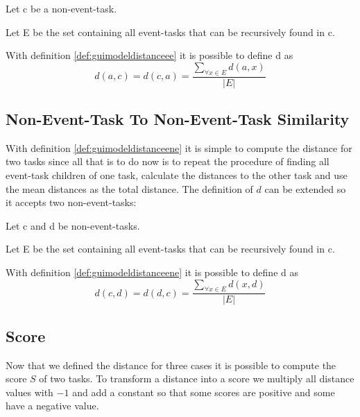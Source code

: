 \begin{definition}
	\item Let c be a non-event-task.
	\item Let E be the set containing all event-tasks that can be recursively found in c.
	\item With definition \ref{def:guimodeldistanceee} it is possible to define d as
\begin{equation*}
	d(a,c) = d(c,a) = \frac{\sum_{\forall x \in E} d(a,x)}{|E|}
\end{equation*}
\label{def:guimodeldistanceene}
\end{definition}

\subsection{Non-Event-Task To Non-Event-Task Similarity}
With definition \ref{def:guimodeldistanceene} it is simple to compute the distance for two tasks since all that is to do now is to repeat the procedure of finding all event-task children of one task, calculate the distances to the other task and use the mean distances as the total distance.
The definition of $d$ can be extended so it accepts two non-event-tasks:

\begin{definition}
	\item Let c and d be non-event-tasks.
	\item Let E be the set containing all event-tasks that can be recursively found in c.
	\item With definition \ref{def:guimodeldistanceene} it is possible to define d as
	\begin{equation*}
		d(c,d) = d(d,c) = \frac{\sum_{\forall x \in E} d(x,d)}{|E|}
	\end{equation*}
\label{def:guimodeldistancenene}
\end{definition}
\subsection{Score}
Now that we defined the distance for three cases it is possible to compute the score $S$ of two tasks.
To transform a distance into a score we multiply all distance values with $-1$ and add a constant so that some scores are positive and some have a negative value.

